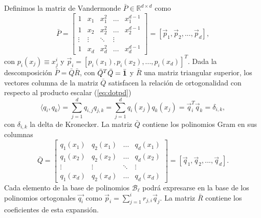  Definimos la matriz de Vandermonde $\bar{P}\in\mathbb{R}^{d \times d}$ como
 \begin{equation}
\bar{P}=
\begin{bmatrix}
    1  & x_{1} & x_{1}^2 & \dots  & x_{1}^{d-1} \\
    1  & x_{2} & x_{2}^2 & \dots  & x_{2}^{d-1} \\
    \vdots  & \vdots & \ddots & \vdots \\
    1 & x_{d} & x_{d}^2 & \dots  & x_{d}^{d-1}
\end{bmatrix}
=[\vec{p}_1,\vec{p}_2,...,\vec{p}_{d}],
\label{eq:Vandermonde}
\end{equation}
con $p_i(x_j)\equiv x_j^i$ y $\vec{p}_i=[p_i(x_1),p_i(x_2),...,p_i(x_{d})]^T$. 
Dada la descomposición $\bar{P}=\bar{Q}\bar{R}$, con $\bar{Q}^T\bar{Q}= \bar{\mathbf{1}}$ y $\bar{R}$ una matriz triangular superior, los vectores columna 
de la matriz $\bar{Q}$ satisfacen la relación de ortogonalidad con respecto al producto escalar 
(\ref{eq:dotpd}) 
\begin{equation*}
\displaystyle \langle q_i,q_k \rangle = \sum_{j=1}^{d}q_{i,j}q_{j,k}=\sum_{j=1}^{d}q_i(x_j)q_k(x_j)=\vec{q}_i^T\vec{q}_k=\delta_{i,k} ,
\end{equation*}
con $\delta_{i,k}$ la delta de 
Kronecker. 
La matriz $\bar{Q}$ contiene los polinomios Gram en sus columnas
\begin{equation}
\bar{Q}=
\begin{bmatrix}
    q_1(x_1) & q_2(x_1) & \dots  & q_{d}(x_1) \\
    q_1(x_2) & q_2(x_2) & \dots  & q_{d}(x_2) \\
    \vdots &  \vdots & \ddots & \vdots \\
    q_1(x_{d}) & q_2(x_{d}) & \dots  &q_{d}(x_{d})
\end{bmatrix}=[\vec{q}_1,\vec{q}_2,...,\vec{q}_{d}].
\label{eq:VandermondeQR}
\end{equation}
Cada elemento de la base de polinomios $\mathcal{B}_{\ell}$  podrá expresarse en la base de los polinomios ortogonales $\vec{q_i}$ como $\displaystyle \vec{p}_i=\sum_{j=1}^{i}r_{j,i}\vec{q}_j$. La matriz $\bar{R}$ contiene los coeficientes de esta expansión.

